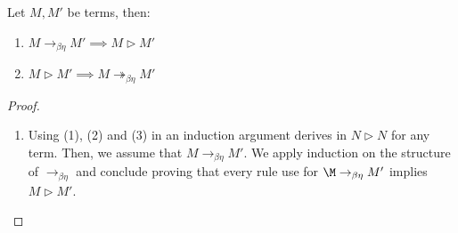 \begin{lemma}
  Let $M,M'$ be terms, then:
  \begin{enumerate}
  \item $M\to_{\beta\eta} M'\implies M \triangleright M'$
  \item $M\triangleright M'\implies M \twoheadrightarrow_{\beta\eta} M'$
  \end{enumerate}
\end{lemma}
\begin{proof}
  \begin{enumerate}
  \item Using (1), (2) and (3) in an induction argument derives in $N\triangleright N$ for any term. Then, we assume that $M\to_{\beta\eta}M'$. We  apply induction on the structure of $\to_{\beta\eta}$ and conclude proving that every rule use for $\M \to_{\beta\eta} M'$ implies $M \triangleright M'$.


\end{enumerate}
\end{proof}
